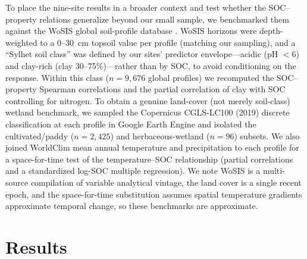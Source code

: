 \documentclass[preprint,authoryear,12pt]{elsarticle}
\begin{document}
To place the nine-site results in a broader context and test whether the SOC--property relations
generalize beyond our small sample, we benchmarked them against the WoSIS global soil-profile
database \citep{Batjes2020}. WoSIS horizons were depth-weighted to a 0--30~cm topsoil value per
profile (matching our sampling), and a ``Sylhet soil class'' was defined by our sites' predictor
envelope---acidic (pH $<6$) and clay-rich (clay 30--75\%)---rather than by SOC, to avoid
conditioning on the response. Within this class ($n=9{,}676$ global profiles) we recomputed the SOC--property Spearman
correlations and the partial correlation of clay with SOC controlling for nitrogen. To obtain a
genuine land-cover (not merely soil-class) wetland benchmark, we sampled the Copernicus CGLS-LC100
(2019) discrete classification \citep{Buchhorn2020} at each profile in Google Earth Engine and
isolated the cultivated/paddy ($n=2{,}425$) and herbaceous-wetland ($n=96$) subsets. We also
joined WorldClim mean annual temperature and precipitation \citep{Hijmans2005} to each profile
for a space-for-time test of the temperature--SOC relationship (partial correlations and a
standardized log-SOC multiple regression). We note WoSIS is a multi-source compilation of
variable analytical vintage, the land cover is a single recent epoch, and the space-for-time
substitution assumes spatial temperature gradients approximate temporal change, so these
benchmarks are approximate.

\section{Results}
\label{sec:results}
\end{document}
